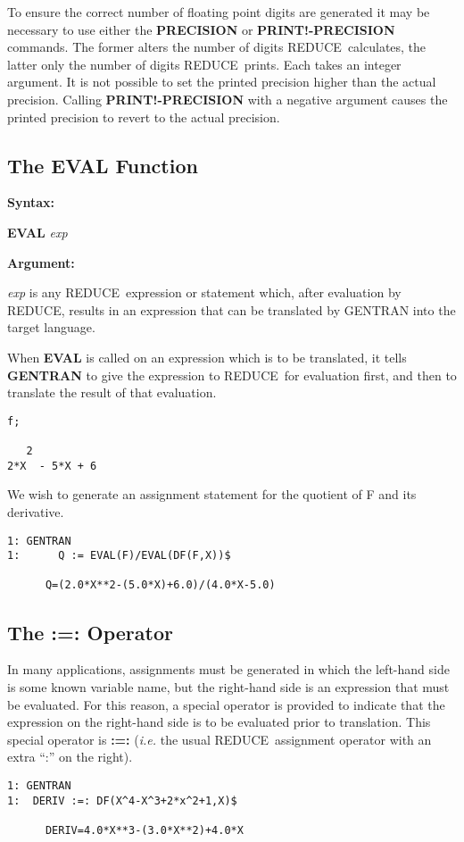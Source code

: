\documentclass[11pt,letterpaper]{book}
\makeatletter
\newcommand{\REDUCE}{REDUCE}
\newcommand{\underscore}{\_}
\newcommand{\ttindex}[1]{{\renewcommand{\_}{\protect\underscore}%
                          \index{#1@{\tt #1}}}}
\newenvironment{describe}[1]{\par{\bf #1}\begin{indented}}{\end{indented}}
\makeatother
\begin{document}
To ensure the correct number of floating point digits are
generated it may be necessary to use either the {\bf PRECISION} or
{\bf PRINT!-PRECISION} commands.  The former alters the number of
digits \REDUCE\ calculates, the latter only the number of digits
\REDUCE\ prints.  Each takes an integer argument.  It is not possible to set
the printed precision higher than the actual precision.  Calling {\bf
PRINT!-PRECISION} with a negative argument causes the printed
precision to revert to the actual precision.

\subsection{The EVAL Function}
\label{eval}
\begin{describe}{Syntax:}
{\bf EVAL} {\it exp}
\end{describe}\ttindex{EVAL}
\begin{describe}{Argument:}
{\it exp} is any \REDUCE\ expression or statement which, after evaluation
by \REDUCE, results in an expression that can be translated by
GENTRAN into the target language.
\end{describe}
When {\bf EVAL} is called on an expression which is to be translated, it
tells {\bf GENTRAN} to give the expression to \REDUCE\ for evaluation
first, and then to translate the result of that evaluation.

{\small\begin{verbatim}
f;

   2
2*X  - 5*X + 6
\end{verbatim}}
We wish to generate an assignment statement for the quotient
of F and its derivative.
{\small\begin{verbatim}
1: GENTRAN
1:      Q := EVAL(F)/EVAL(DF(F,X))$

      Q=(2.0*X**2-(5.0*X)+6.0)/(4.0*X-5.0)
\end{verbatim}}

\subsection{The :=: Operator}
\index{:=:}
\label{rsetq}
In many applications, assignments must be generated in which the
left-hand side is some known variable name, but the
right-hand side is an expression that must be evaluated.  For
this reason, a special operator is provided to indicate that the expression
on the right-hand side is to be evaluated prior to translation.  This
special operator is {\bf :=:} ({\em i.e.} the usual \REDUCE\ assignment operator
with an extra ``:'' on the right).
\begin{describe}{\example}
{\small\begin{verbatim}
1: GENTRAN
1:  DERIV :=: DF(X^4-X^3+2*x^2+1,X)$

      DERIV=4.0*X**3-(3.0*X**2)+4.0*X
\end{verbatim}}
\end{describe}
\end{document}

